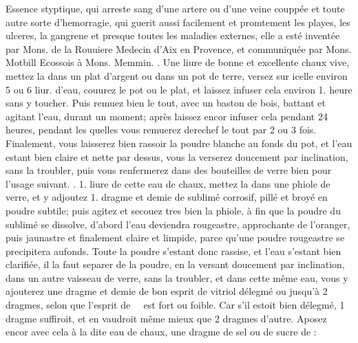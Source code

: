 %
%
\vspace{8mm}%
\count{}
\count{}
\count{}
\pstart%
\normalsize%
\noindent%
[86~r\textsuperscript{o}]
\pend%
\pstart%
\noindent%
\centering%
Essence styptique,
\pend%
\pstart%
\noindent%
qui arreste sang d'une artere ou d'une veine coupp\'{e}e et toute autre sorte d'hemorragie, qui guerit aussi facilement et promtement les playes, les ulceres, la gangrene et presque toutes les maladies externes, elle a est\'{e} invent\'{e}e par Mons. de la Rouuiere\protect{} Medecin d'Aix en Provence\protect{}, et communiqu\'{e}e par Mons. Motbill\protect{} Ecossois \`{a} Mons. \label{????}Memmin.\protect{}%
\pend%
\pstart%
\textrecipe. Une liure de bonne et excellente chaux vive, mettez la dans un plat d'argent ou dans un pot de terre, versez sur icelle environ 5 ou 6 liur. d'eau, couurez le pot ou le plat, et laissez infuser cela environ 1. heure sans y toucher. Puis remuez bien le tout, avec un baston de bois, battant et agitant l'eau, durant un moment; apr\`{e}s laissez encor infuser cela pendant 24 heures, pendant les quelles vous remuerez derechef le tout par 2 ou 3 fois. Finalement, vous laisserez bien rassoir la poudre blanche au fonds du pot, et l'eau estant bien claire et nette par dessus, vous la verserez doucement par inclination, sans la 
\pend
\newpage
\pstart \noindent troubler, puis vous renfermerez dans des bouteilles de verre bien  pour l'usage suivant. 
\pend%
\pstart%
\textrecipe. 1. liure de cette eau de chaux, mettez la dans une phiole de verre, et y adjoutez 1. dragme et demie de sublim\'{e} corrosif, pill\'{e} et broy\'{e} en poudre subtile; puis agitez et secouez tres bien la phiole, \`{a} fin que la poudre du sublim\'{e} se dissolve, d'abord l'eau deviendra rougeastre, approchante de l'oranger, puis jaunastre et finalement claire et limpide, parce qu'une poudre rougeastre se precipitera aufonds. Toute la poudre s'estant donc rassise, et l'eau s'estant bien clarifi\'{e}e, il la faut separer de la poudre, en la versant doucement par inclination, dans un autre vaisseau de verre, sans la troubler, et dans cette m\^{e}me eau, vous y ajouterez une dragme et demie de bon esprit de vitriol d\'{e}legm\'{e} ou jusqu'\`{a} 2 dragmes, selon que l'esprit de \includegraphics[width=0.02\textwidth]{images/vitriol2.pdf} est fort ou foible. Car s'il estoit bien d\'{e}legm\'{e}, 1 dragme suffiroit, et en vaudroit m\^{e}me mieux que 2 dragmes d'autre. Aposez encor avec cela \`{a} la dite eau de chaux, une dragme de sel ou de sucre de \saturn: 
